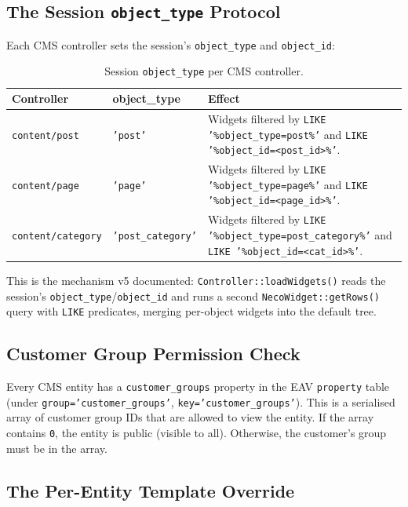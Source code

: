 \documentclass[11pt,a4paper]{article}
\begin{document}
\subsection{The Session \texttt{object\_type} Protocol}

Each CMS controller sets the session's \texttt{object\_type} and
\texttt{object\_id}:

\begin{table}[htbp]
\centering
\caption{Session \texttt{object\_type} per CMS controller.}\label{tab:object-types}
\small
\begin{tabularx}{\columnwidth}{llX}
\toprule
\textbf{Controller} & \textbf{object\_type} & \textbf{Effect} \\
\midrule
\texttt{content/post}     & \texttt{'post'}          & Widgets filtered by \texttt{LIKE '\%object\_type=post\%'} and \texttt{LIKE '\%object\_id=<post\_id>\%'}. \\
\texttt{content/page}     & \texttt{'page'}          & Widgets filtered by \texttt{LIKE '\%object\_type=page\%'} and \texttt{LIKE '\%object\_id=<page\_id>\%'}. \\
\texttt{content/category} & \texttt{'post\_category'} & Widgets filtered by \texttt{LIKE '\%object\_type=post\_category\%'} and \texttt{LIKE '\%object\_id=<cat\_id>\%'}. \\
\bottomrule
\end{tabularx}
\end{table}

This is the mechanism v5 documented: \texttt{Controller::loadWidgets()} reads
the session's \texttt{object\_type}/\texttt{object\_id} and runs a second
\texttt{NecoWidget::getRows()} query with \texttt{LIKE} predicates, merging
per-object widgets into the default tree.

\subsection{Customer Group Permission Check}

Every CMS entity has a \texttt{customer\_groups} property in the EAV
\texttt{property} table (under \texttt{group='customer\_groups'},
\texttt{key='customer\_groups'}). This is a serialised array of customer
group IDs that are allowed to view the entity. If the array contains
\texttt{0}, the entity is public (visible to all). Otherwise, the
customer's group must be in the array.

\subsection{The Per-Entity Template Override}
\end{document}
